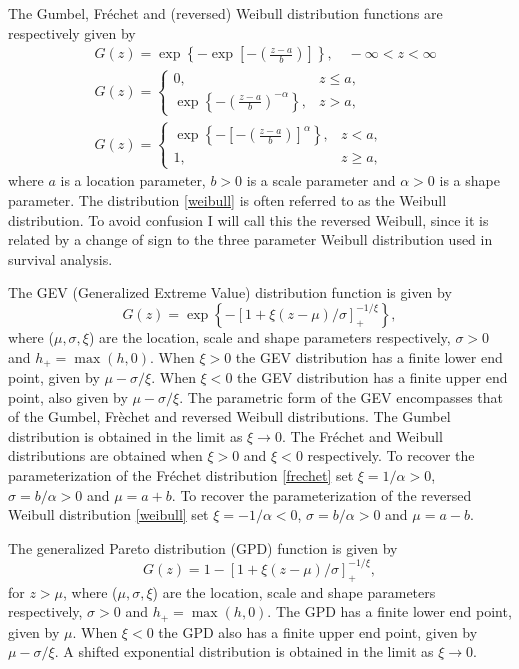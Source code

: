 \documentclass[11pt,a4paper]{article}
\begin{document}
The Gumbel, Fr\'{e}chet and (reversed) Weibull distribution functions are respectively given by
\begin{align}
&G(z) = \exp\left\{-\exp\left[-\left(\frac{z-a}{b}\right)\right]\right\}, 
        \quad -\infty < z < \infty \label{gumbel} \\
&G(z) = \begin{cases}
        0, & z \leq a, \\
        \exp\left\{-\left(\frac{z-a}{b}\right)^{-\alpha}\right\}, & z > a,
        \end{cases} \label{frechet} \\ 
&G(z) = \begin{cases}
        \exp\left\{-\left[-\left(\frac{z-a}{b}\right)\right]^{\alpha}\right\},
        & z < a, \\
        1, & z \geq a,
        \end{cases} \label{weibull}
\end{align}
where $a$ is a location parameter, $b > 0$ is a scale parameter and $\alpha > 0$ is a shape parameter. 
The distribution \eqref{weibull} is often referred to as the Weibull distribution. 
To avoid confusion I will call this the reversed Weibull, since it is related  by a change of sign to the three parameter Weibull distribution used in survival analysis.

The GEV (Generalized Extreme Value) distribution function is given by
\begin{equation}
G(z) = \exp \left\{ - \left[ 1+ \xi \left( z-\mu \right) /\sigma  \right]_{+}^{-1/\xi} \right\},
\label{gev}
\end{equation}   
where ($\mu,\sigma,\xi$) are the location, scale and shape parameters respectively, $\sigma > 0$ and $h_{+}=\max(h,0)$.
When $\xi>0$ the GEV distribution has a finite lower end point, given by $\mu - \sigma/\xi$.
When $\xi<0$ the GEV distribution has a finite upper end point, also given by $\mu - \sigma/\xi$. 
The parametric form of the GEV encompasses that of the Gumbel, Fr\`{e}chet and reversed Weibull distributions. 
The Gumbel distribution is obtained in the limit as $\xi\rightarrow0$.
The Fr\'{e}chet and Weibull distributions are obtained when $\xi>0$ and $\xi<0$ respectively. 
To recover the parameterization of the Fr\'{e}chet distribution \eqref{frechet} set $\xi=1/\alpha>0$, $\sigma=b/\alpha>0$ and $\mu=a+b$.
To recover the parameterization of the reversed Weibull distribution \eqref{weibull} set $\xi=-1/\alpha<0$, $\sigma=b/\alpha>0$ and $\mu=a-b$.

The generalized Pareto distribution (GPD) function is given by
\begin{equation}
G(z) = 1 - \left[1 + \xi \left( z-\mu \right) /\sigma  \right]_{+}^{-1/\xi},
\label{gpd}
\end{equation}   
for $z > \mu$, where ($\mu,\sigma,\xi$) are the location, scale and shape parameters respectively, $\sigma > 0$ and $h_{+}=\max(h,0)$.
The GPD has a finite lower end point, given by $\mu$.
When $\xi<0$ the GPD also has a finite upper end point, given by $\mu - \sigma/\xi$.
A shifted exponential distribution is obtained in the limit as $\xi\rightarrow0$.
\end{document}
